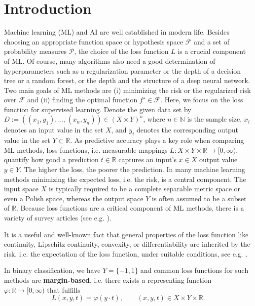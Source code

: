 \documentclass[10pt]{article}
\newcommand{\R}{\mathbb{R}}
\newcommand{\N}{\mathbb{N}}
\newcommand{\XY}{X \times Y}
\begin{document}
\section{Introduction} \label{Kap_Intro}
Machine learning (ML) and AI are well established in modern life.
Besides choosing an appropriate function space or hypothesis space $\mathcal{F}$ and a set of probability measures $\mathcal{P}$, the choice of the loss function $L$ is a crucial component of ML. Of course, many algorithms also need a good determination of hyperparameters such as a regularization parameter or the depth of a decision tree or a random forest, or the depth and the structure of
a deep neural network.
Two main goals of ML methods are (i) minimizing the risk or the regularized risk over $\mathcal{F}$ and (ii) finding the optimal function $f^\star \in \mathcal{F}$.
Here, we focus on the loss function for supervised learning.
Denote the given data set by $D:=((x_1,y_1), \ldots, (x_n,y_n))\in (\XY)^n$, where $n\in\N$ is the sample size, $x_i$ denotes an input value in the set $X$, and $y_i$ denotes the corresponding output value in the set $Y\subset \R$.
As predictive accuracy plays a key role when comparing ML methods, loss functions, i.e. measurable mappings $L: \XY \times \R \to [0, \infty)$, quantify how good a prediction $t \in \R$ captures an input's $x \in X$ output value $y \in Y$.
The higher the loss, the poorer the prediction.
In many machine learning methods minimizing the expected loss, i.e. the risk, is a central component.  
The input space $X$ is typically required to be a complete separable metric space or even a Polish space, whereas the output space $Y$ is often assumed to be a subset of $\R$. 
Because loss functions are a critical component of ML methods, there is a variety of survey articles (see e.g. \cite{TianEtAl2022, TervenEtAl2025, CiampiconiEtAl2024}). \par
It is a useful and well-known fact that general properties of the loss function like continuity, Lipschitz continuity, convexity, or differentiability are inherited by the risk, i.e. the expectation of the loss function, under suitable conditions, see e.g. \cite[Chapter 2.2]{SC08}. \par 
In binary classification, we have $Y = \{-1,1\}$ and common loss functions for such methods are \textbf{margin-based}, i.e. there exists a representing function $\varphi: \R \to [0, \infty)$ that fulfills
\begin{equation*}
	L(x,y,t) = \varphi(y \cdot t),  \qquad (x,y,t) \in \XY \times \R.
\end{equation*}
\end{document}
